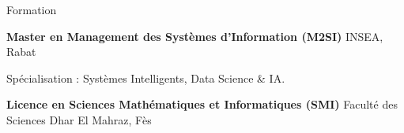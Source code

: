 
\begin{rubric}{Formation}

\entry*[2023 -- 2025]%
    \textbf{Master en Management des Systèmes d'Information (M2SI)}  INSEA, Rabat
    \par Spécialisation : Systèmes Intelligents, Data Science \& IA.

\entry*[2020 -- 2023]%
    \textbf{Licence en Sciences Mathématiques et Informatiques (SMI)}  Faculté des Sciences Dhar El Mahraz, Fès

\end{rubric}
